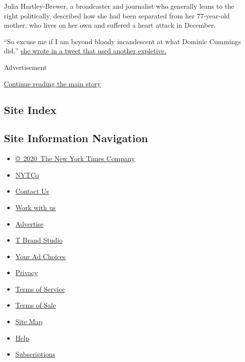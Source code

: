 Julia Hartley-Brewer, a broadcaster and journalist who generally leans
to the right politically, described how she had been separated from her
77-year-old mother, who lives on her own and suffered a heart attack in
December.

``So excuse me if I am beyond bloody incandescent at what Dominic
Cummings did,''
\href{https://twitter.com/JuliaHB1/status/1263939337030438917}{she wrote
in a tweet that used another expletive.}

Advertisement

\protect\hyperlink{after-bottom}{Continue reading the main story}

\hypertarget{site-index}{%
\subsection{Site Index}\label{site-index}}

\hypertarget{site-information-navigation}{%
\subsection{Site Information
Navigation}\label{site-information-navigation}}

\begin{itemize}
\tightlist
\item
  \href{https://help.nytimes3xbfgragh.onion/hc/en-us/articles/115014792127-Copyright-notice}{©~2020~The
  New York Times Company}
\end{itemize}

\begin{itemize}
\tightlist
\item
  \href{https://www.nytco.com/}{NYTCo}
\item
  \href{https://help.nytimes3xbfgragh.onion/hc/en-us/articles/115015385887-Contact-Us}{Contact
  Us}
\item
  \href{https://www.nytco.com/careers/}{Work with us}
\item
  \href{https://nytmediakit.com/}{Advertise}
\item
  \href{http://www.tbrandstudio.com/}{T Brand Studio}
\item
  \href{https://www.nytimes3xbfgragh.onion/privacy/cookie-policy\#how-do-i-manage-trackers}{Your
  Ad Choices}
\item
  \href{https://www.nytimes3xbfgragh.onion/privacy}{Privacy}
\item
  \href{https://help.nytimes3xbfgragh.onion/hc/en-us/articles/115014893428-Terms-of-service}{Terms
  of Service}
\item
  \href{https://help.nytimes3xbfgragh.onion/hc/en-us/articles/115014893968-Terms-of-sale}{Terms
  of Sale}
\item
  \href{https://spiderbites.nytimes3xbfgragh.onion}{Site Map}
\item
  \href{https://help.nytimes3xbfgragh.onion/hc/en-us}{Help}
\item
  \href{https://www.nytimes3xbfgragh.onion/subscription?campaignId=37WXW}{Subscriptions}
\end{itemize}
